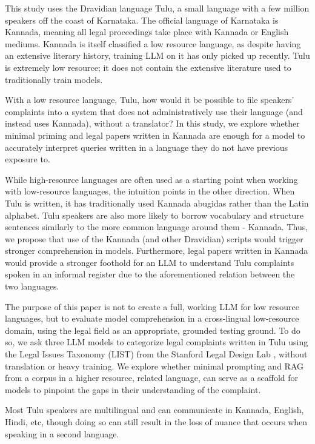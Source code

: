 \documentclass[11pt]{article}
\begin{document}
This study uses the Dravidian language Tulu, a small language with a few million speakers off the coast of Karnataka. The official language of Karnataka is Kannada, meaning all legal proceedings take place with Kannada or English mediums. Kannada is itself classified a low resource language, as despite having an extensive literary history, training LLM on it has only picked up recently. Tulu is extremely low resource; it does not contain the extensive literature used to traditionally train models.

With a low resource language, Tulu, how would it be possible to file speakers' complaints into a system that does not administratively use their language (and instead uses Kannada), without a translator? In this study, we explore whether minimal priming and legal papers written in Kannada are enough for a model to accurately interpret queries written in a language they do not have previous exposure to. 

While high-resource languages are often used as a starting point when working with low-resource languages, the intuition points in the other direction. When Tulu is written, it has traditionally used Kannada abugidas rather than the Latin alphabet. Tulu speakers are also more likely to borrow vocabulary and structure sentences similarly to the more common language around them - Kannada. Thus, we propose that use of the Kannada (and other Dravidian) scripts would trigger stronger comprehension in models. Furthermore, legal papers written in Kannada would provide a stronger foothold for an LLM to understand Tulu complaints spoken in an informal register due to the aforementioned relation between the two languages. 

The purpose of this paper is not to create a full, working LLM for low resource languages, but to evaluate model comprehension in a cross-lingual low-resource domain, using the legal field as an appropriate, grounded testing ground. To do so, we ask three LLM models to categorize legal complaints written in Tulu using the Legal Issues Taxonomy (LIST) from the Stanford Legal Design Lab \citep{stanfordlegaldesignlab_list}, without translation or heavy training. We explore whether minimal prompting and RAG from a corpus in a higher resource, related language, can serve as a scaffold for models to pinpoint the gaps in their understanding of the complaint. 

Most Tulu speakers are multilingual and can communicate in Kannada, English, Hindi, etc, though doing so can still result in the loss of nuance that occurs when speaking in a second language. %
\end{document}
